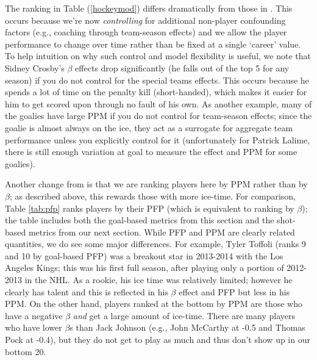 The ranking in Table (\ref{hockeymod}) differs dramatically from those in
\cite{gramacy:jensen:taddy:2013}.  This occurs because we're now
\textit{controlling} for additional non-player confounding factors (e.g.,
coaching through team-season effects) and we allow the player performance to
change over time rather than be fixed at a single `career' value.   To help
intuition on why such control and model flexibility is useful, we note that
Sidney Crosby's $\beta$ effects drop significantly (he falls out of the top 5
for any season) if you do not control for the special teams effects.  This
occurs because he spends a lot of time on the penalty kill (short-handed),
which makes it easier for him to get scored upon through no fault of his own.
As another example, many of the goalies have large PPM if you do not control
for team-season effects; since the goalie is almost always on the ice, they
act as a surrogate for aggregate team performance unless you explicitly
control for it (unfortunately for Patrick Lalime, there is still enough
variation at goal to measure the effect and PPM for some goalies).

Another change from \cite{gramacy:jensen:taddy:2013} is that we are ranking
players here by PPM rather than by $\beta$; as described above, this rewards
those with more ice-time. For comparison, Table \ref{tab:pfp} ranks players by
their PFP (which is equivalent to ranking by $\beta$); the table includes both
the goal-based metrics from this section and the shot-based metrics from our
next section. While PFP and PPM are clearly related quantities, we do see some
major differences.  For example, Tyler Toffoli (ranks 9 and 10 by goal-based
PFP) was a breakout star in 2013-2014 with the Los Angeles Kings; this was his
first full season, after playing only a portion of 2012-2013 in the NHL.  As a
rookie, his ice time was relatively limited; however he clearly has talent and
this is reflected in his $\beta$ effect and PFP but less in his PPM.  On the
other hand, players ranked at the bottom by PPM are those who have a negative
$\beta$ \textit{and} get a large amount of ice-time. There are many players who have
lower $\beta$s than Jack Johnson (e.g., John McCarthy at -0.5 and Thomas Pock
at -0.4), but they do not get to play as much and thus don't show up in our
bottom 20.



